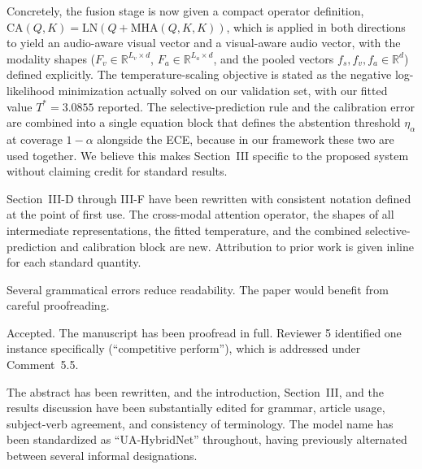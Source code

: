 Concretely, the fusion stage is now given a compact operator definition,
$\mathrm{CA}(Q,K) = \mathrm{LN}\!\left(Q + \mathrm{MHA}(Q,K,K)\right)$,
which is applied in both directions to yield an audio-aware visual vector
and a visual-aware audio vector, with the modality shapes
($F_v \in \mathbb{R}^{L_v \times d}$, $F_a \in \mathbb{R}^{L_a \times d}$,
and the pooled vectors $f_s, f_v, f_a \in \mathbb{R}^{d}$) defined
explicitly. The temperature-scaling objective is stated as the negative
log-likelihood minimization actually solved on our validation set, with
our fitted value $T^{*} = 3.0855$ reported. The selective-prediction rule
and the calibration error are combined into a single equation block that
defines the abstention threshold $\eta_\alpha$ at coverage $1 - \alpha$
alongside the ECE, because in our framework these two are used together.
We believe this makes Section~III specific to the proposed system without
claiming credit for standard results.

\begin{changesblock}
Section~III-D through III-F have been rewritten with consistent
notation defined at the point of first use. The cross-modal attention
operator, the shapes of all intermediate representations, the fitted
temperature, and the combined selective-prediction and calibration block
are new. Attribution to prior work is given inline for each standard
quantity.
\end{changesblock}


\begin{reviewercomment}
Several grammatical errors reduce readability. The paper would benefit
from careful proofreading.
\end{reviewercomment}

\response Accepted. The manuscript has been proofread in full. Reviewer 5
identified one instance specifically (``competitive perform''), which is
addressed under Comment~5.5.

\begin{changesblock}
The abstract has been rewritten, and the introduction,
Section~III, and the results discussion have been substantially edited
for grammar, article usage, subject-verb agreement, and consistency of
terminology. The model name has been standardized as ``UA-HybridNet''
throughout, having previously alternated between several informal
designations.
\end{changesblock}


